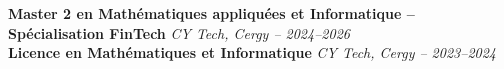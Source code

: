 \textbf{Master 2 en Mathématiques appliquées et Informatique – Spécialisation FinTech} \hfill \textit{CY Tech, Cergy – 2024–2026}\\
\textbf{Licence en Mathématiques et Informatique} \hfill \textit{CY Tech, Cergy – 2023–2024}
